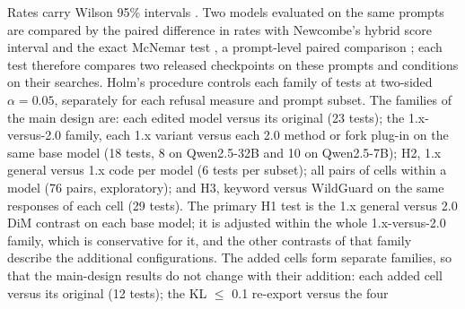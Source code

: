 Rates carry Wilson 95\% intervals \cite{wilson1927probable}. Two models evaluated on the same prompts are compared
by the paired difference in rates with Newcombe's hybrid score interval \cite{newcombe1998improved} and the exact
McNemar test \cite{mcnemar1947note}, a prompt-level paired comparison \cite{miller2024adding}; each test therefore
compares two released checkpoints on these prompts and conditions on their searches. Holm's procedure
\cite{holm1979simple} controls each family of tests at two-sided $\alpha=0.05$, separately for each refusal measure
and prompt subset. The families of the main design are: each edited model versus its original (23 tests); the
1.x-versus-2.0 family, each 1.x variant versus each 2.0 method or fork plug-in on the same base model (18 tests, 8
on Qwen2.5-32B and 10 on Qwen2.5-7B); H2, 1.x general versus 1.x code per model (6 tests per subset); all pairs of
cells within a model (76 pairs, exploratory); and H3, keyword versus WildGuard on the same responses of each cell
(29 tests). The primary H1 test is the 1.x general versus 2.0 DiM contrast on each base model; it is adjusted within
the whole 1.x-versus-2.0 family, which is conservative for it, and the other contrasts of that family describe the
additional configurations. The added cells form separate families, so that the main-design results do not change
with their addition: each added cell versus its original (12 tests); the KL $\le$ 0.1 re-export versus the four
